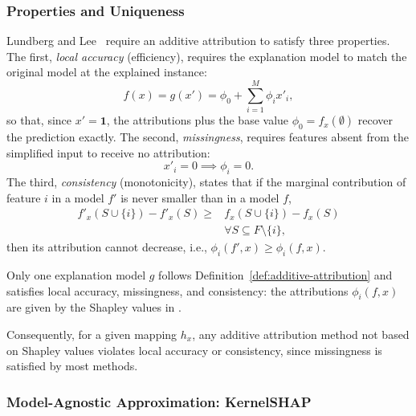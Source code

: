     \subsubsection{Properties and Uniqueness}
    \label{sec:shap-axioms}

    Lundberg and Lee~\cite{NIPS2017_8a20a862} require an additive attribution to satisfy three properties. The first, \textit{local accuracy} (efficiency), requires the explanation model to match the original model at the explained instance:
    \begin{equation}
        f(x) = g(x') = \phi_0 + \sum_{i=1}^M \phi_i x'_i ,
        \label{eq:local-accuracy}
    \end{equation}
    so that, since $x' = \mathbf{1}$, the attributions plus the base value $\phi_0 = f_x(\emptyset)$ recover the prediction exactly. The second, \textit{missingness}, requires features absent from the simplified input to receive no attribution:
    \begin{equation}
        x'_i = 0 \implies \phi_i = 0 .
        \label{eq:missingness}
    \end{equation}
    The third, \textit{consistency} (monotonicity), states that if the marginal contribution of feature $i$ in a model $f'$ is never smaller than in a model $f$,
    \begin{equation}
        \begin{split}
            f'_x(S \cup \{i\}) - f'_x(S) \ge{} & f_x(S \cup \{i\}) - f_x(S) \\
            & \forall S \subseteq F \setminus \{i\},
        \end{split}
        \label{eq:consistency}
    \end{equation}
    then its attribution cannot decrease, i.e., $\phi_i(f', x) \ge \phi_i(f, x)$.

    \begin{theorem}
    \label{thm:shapley-uniqueness}
    Only one explanation model $g$ follows Definition~\ref{def:additive-attribution} and satisfies local accuracy, missingness, and consistency: the attributions $\phi_i(f, x)$ are given by the Shapley values in .
    \end{theorem}

    Consequently, for a given mapping $h_x$, any additive attribution method not based on Shapley values violates local accuracy or consistency, since missingness is satisfied by most methods.

    \subsubsection{Model-Agnostic Approximation: KernelSHAP}
    \label{sec:kernelshap-mechanism}

